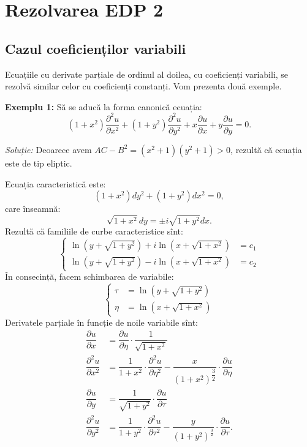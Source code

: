 
\chapter{Rezolvarea EDP 2}

\section{Cazul coeficienților variabili}

\indent\indent Ecuațiile cu derivate parțiale de ordinul al doilea, cu coeficienți variabili,
se rezolvă similar celor cu coeficienți constanți. Vom prezenta două exemple.

\textbf{Exemplu 1:} Să se aducă la forma canonică ecuația:
\[
  (1 + x^2)\dfrac{\partial^2 u}{\partial x^2} + %
  (1 + y^2)\dfrac{\partial^2 u}{\partial y^2} + %
  x \dfrac{\partial u}{\partial x} + y \dfrac{\partial u}{\partial y} = 0.
\]

\emph{Soluție:} Deoarece avem $ AC - B^2 = (x^2 + 1)(y^2 + 1) > 0 $, rezultă
că ecuația este de tip eliptic.

Ecuația caracteristică este:
\[
  (1 + x^2)dy^2 + (1 + y^2) dx^2 = 0,
\]
care înseamnă:
\[
  \sqrt{1 + x^2} dy = \pm i \sqrt{1 + y^2} dx.
\]
Rezultă că familiile de curbe caracteristice sînt:
\[
  \begin{cases}
    \ln(y + \sqrt{1 + y^2}) + i \ln(x + \sqrt{1 + x^2}) &= c_1 \\
    \ln(y + \sqrt{1 + y^2}) - i \ln(x + \sqrt{1 + x^2}) &= c_2
  \end{cases}
\]
În consecință, facem schimbarea de variabile:
\[
  \begin{cases}
    \tau &= \ln(y + \sqrt{1 + y^2}) \\
    \eta &= \ln(x + \sqrt{1 + x^2})
  \end{cases}
\]
Derivatele parțiale în funcție de noile variabile sînt:
\begin{align*}
  \dfrac{\partial u}{\partial x} &= \dfrac{\partial u}{\partial \eta} \cdot %
                                  \dfrac{1}{\sqrt{1 + x^2}} \\
  \dfrac{\partial^2 u}{\partial x^2} &= \dfrac{1}{1 + x^2} \cdot \dfrac{\partial^2 u}{\partial \eta^2}%
                                      - \dfrac{x}{(1 + x^2)^{\dfrac{3}{2}}} \cdot %
                                      \dfrac{\partial u}{\partial \eta} \\
  \dfrac{\partial u}{\partial y} &= \dfrac{1}{\sqrt{1 + y^2}} \cdot \dfrac{\partial u}{\partial \tau} \\
  \dfrac{\partial^2 u}{\partial y^2} &= \dfrac{1}{1 + y^2} \cdot \dfrac{\partial^2 u}{\partial \tau^2}%
                                      - \dfrac{y}{(1 + y^2)^{\frac{3}{2}}} \cdot %
                                      \dfrac{\partial u}{\partial \tau}.
\end{align*}

